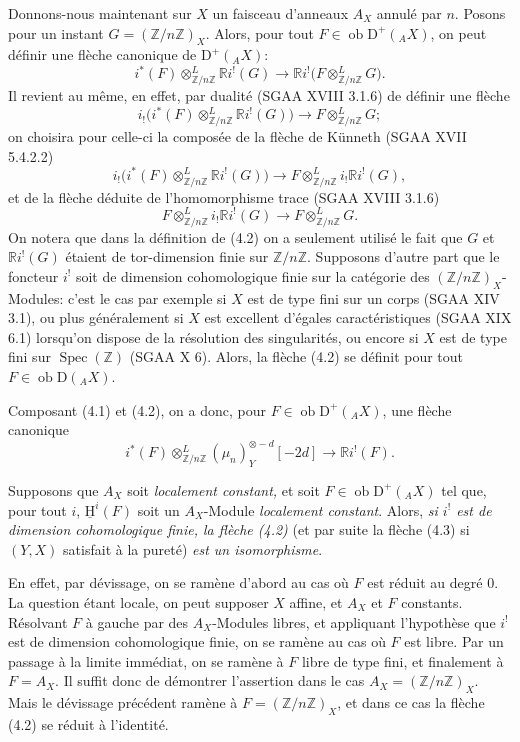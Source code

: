 \documentclass[11pt]{article}
\providecommand{\uH}{\underline{\mathrm H}}
\DeclareMathOperator{\Spec}{Spec}
\newcommand{\R}{\mathbb{R}}\newcommand{\RHomCore}{\mathbb{R}\mathrm{Hom}}
\newcommand{\D}{\mathrm{D}}
\newcommand{\Z}{\mathbb{Z}}
\newcommand{\ob}{\operatorname{ob}}
\providecommand{\ob}{\operatorname{ob}}
\providecommand{\R}{\mathrm R}
\providecommand{\Z}{\mathbb Z}
\providecommand{\Spec}{\operatorname{Spec}}
\providecommand{\Spec}{\operatorname{Spec}}
\providecommand{\Spec}{\operatorname{Spec}}
\providecommand{\Spec}{\operatorname{Spec}}
\begin{document}
Donnons-nous maintenant sur $X$ un faisceau d'anneaux $A_X$ annulé par $n$. Posons pour un instant $G=(\Z/n\Z)_X$. Alors, pour tout $F\in\ob\D^+({}_A X)$, on peut définir une flèche canonique de $\D^+({}_A X)$:
\begin{equation}\tag{4.2}
        i^*(F)\otimes^L_{\Z/n\Z} \R i^!(G)\longrightarrow \R i^!\bigl(F\otimes^L_{\Z/n\Z}G\bigr).
\end{equation}
Il revient au même, en effet, par dualité (SGAA XVIII 3.1.6) de définir une flèche
\[
        i_!\bigl(i^*(F)\otimes^L_{\Z/n\Z}\R i^!(G)\bigr)\longrightarrow F\otimes^L_{\Z/n\Z}G;
\]
on choisira pour celle-ci la composée de la flèche de Künneth (SGAA XVII 5.4.2.2)
\[
        i_!\bigl(i^*(F)\otimes^L_{\Z/n\Z}\R i^!(G)\bigr)\longrightarrow F\otimes^L_{\Z/n\Z}i_!\R i^!(G),
\]
et de la flèche déduite de l'homomorphisme trace (SGAA XVIII 3.1.6)
\[
        F\otimes^L_{\Z/n\Z}i_!\R i^!(G)\longrightarrow F\otimes^L_{\Z/n\Z}G.
\]
On notera que dans la définition de (4.2) on a seulement utilisé le fait que $G$ et $\R i^!(G)$ étaient de tor-dimension finie sur $\Z/n\Z$. Supposons d'autre part que le foncteur $i^!$ soit de dimension cohomologique finie sur la catégorie des $(\Z/n\Z)_X$-Modules: c'est le cas par exemple si $X$ est de type fini sur un corps (SGAA XIV 3.1), ou plus généralement si $X$ est excellent d'égales caractéristiques (SGAA XIX 6.1) lorsqu'on dispose de la résolution des singularités, ou encore si $X$ est de type fini sur $\Spec(\Z)$ (SGAA X 6). Alors, la flèche (4.2) se définit pour tout $F\in\ob\D({}_A X)$.

Composant (4.1) et (4.2), on a donc, pour $F\in\ob\D^+({}_A X)$, une flèche canonique
\begin{equation}\tag{4.3}
        i^*(F)\otimes^L_{\Z/n\Z}(\mu_n)_Y^{\otimes -d}[-2d]\longrightarrow \R i^!(F).
\end{equation}

Supposons que $A_X$ soit \emph{localement constant,} et soit $F\in\ob\D^+({}_A X)$ tel que, pour tout $i$, $\uH^i(F)$ soit un $A_X$-Module \emph{localement constant}. Alors, \emph{si $i^!$ est de dimension cohomologique finie, la flèche (4.2)} (et par suite la flèche (4.3) si $(Y,X)$ satisfait à la pureté) \emph{est un isomorphisme}.

En effet, par dévissage, on se ramène d'abord au cas où $F$ est réduit au degré $0$. La question étant locale, on peut supposer $X$ affine, et $A_X$ et $F$ constants. Résolvant $F$ à gauche par des $A_X$-Modules libres, et appliquant l'hypothèse que $i^!$ est de dimension cohomologique finie, on se ramène au cas où $F$ est libre. Par un passage à la limite immédiat, on se ramène à $F$ libre de type fini, et finalement à $F=A_X$. Il suffit donc de démontrer l'assertion dans le cas $A_X=(\Z/n\Z)_X$. Mais le dévissage précédent ramène à $F=(\Z/n\Z)_X$, et dans ce cas la flèche (4.2) se réduit à l'identité.
\end{document}
